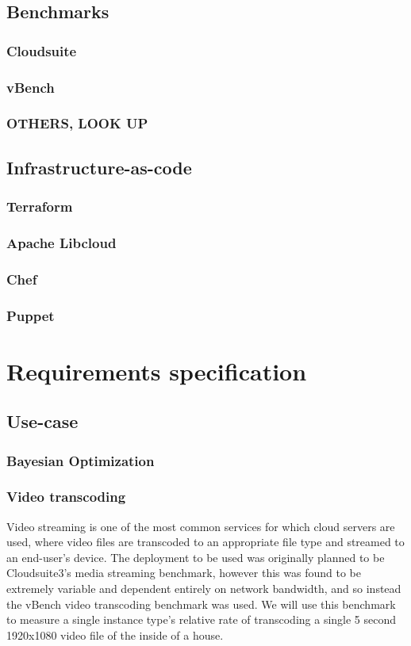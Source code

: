 \documentclass{report}
\begin{document}
\section{Benchmarks}
\subsection{Cloudsuite}
\subsection{vBench}
\subsection{OTHERS, LOOK UP}
\section{Infrastructure-as-code}
\subsection{Terraform}
\subsection{Apache Libcloud}  
\subsection{Chef}
\subsection{Puppet}
\chapter{Requirements specification}
\section{Use-case}
\subsection{Bayesian Optimization}
\subsection{Video transcoding}
Video streaming is one of the most common services for which cloud servers are used, where video files are transcoded to an appropriate file type and streamed to an end-user's device\cite{JunXin2005a, Lottarini2018}.
The deployment to be used was originally planned to be Cloudsuite3's media streaming benchmark\cite{Palit2016}, however this was found to be extremely variable and dependent entirely on network bandwidth, and so instead the vBench video transcoding benchmark was used\cite{Lottarini2018}. We will use this benchmark to measure a single instance type's relative rate of transcoding a single 5 second 1920x1080 video file of the inside of a house.
\end{document}
